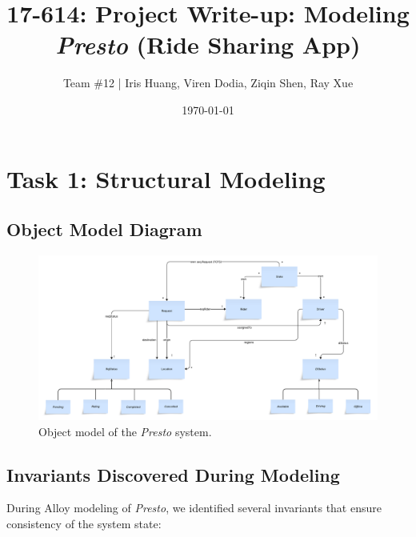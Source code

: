 \documentclass[11pt]{article}
\title{17-614: Project Write-up: Modeling \textit{Presto} (Ride Sharing App)}
\author{Team \#12 \quad | \quad Iris Huang, Viren Dodia, Ziqin Shen, Ray Xue}
\date{\today}
\begin{document}
\maketitle

\newpage

\section{Task 1: Structural Modeling}
\label{sec:task1}

\subsection{Object Model Diagram}
\label{sec:object-model}

\begin{figure}[h]
  \centering
  \includegraphics[width=1.00\linewidth]{figs/object-model.pdf}
  \caption{Object model of the \textit{Presto} system.}
\end{figure}

\subsection{Invariants Discovered During Modeling}

During Alloy modeling of \textit{Presto}, we identified several invariants that ensure consistency of the system state:
\end{document}
